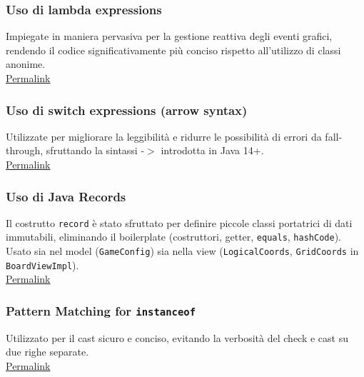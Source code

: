 \documentclass[a4paper,12pt]{report}
\begin{document}
\subsubsection{Uso di lambda expressions}
Impiegate in maniera pervasiva per la gestione reattiva degli eventi grafici, rendendo il codice significativamente più conciso rispetto all'utilizzo di classi anonime.\\
\href{https://github.com/Nick-2002b/PSS25-Gioco-Oca/blob/e81943445d44f9befaaf74b02e1793cb20d0ce74/src/main/java/it/unibo/giocooca/view/impl/SettingsViewImpl.java#L97}{Permalink}

\subsubsection{Uso di switch expressions (arrow syntax)}
Utilizzate per migliorare la leggibilità e ridurre le possibilità di errori da fall-through, sfruttando la sintassi -$>$ introdotta in Java 14+.\\
\href{https://github.com/Nick-2002b/PSS25-Gioco-Oca/blob/e81943445d44f9befaaf74b02e1793cb20d0ce74/src/main/java/it/unibo/giocooca/view/impl/BoardViewImpl.java#L117-L122}{Permalink}

\subsubsection{Uso di Java Records}
Il costrutto \texttt{record} è stato sfruttato per definire piccole classi portatrici di dati immutabili, eliminando il boilerplate (costruttori, getter, \texttt{equals}, \texttt{hashCode}). Usato sia nel model (\texttt{GameConfig}) sia nella view (\texttt{LogicalCoords}, \texttt{GridCoords} in \texttt{BoardViewImpl}).\\
\href{https://github.com/Nick-2002b/PSS25-Gioco-Oca/blob/e81943445d44f9befaaf74b02e1793cb20d0ce74/src/main/java/it/unibo/giocooca/view/impl/BoardViewImpl.java#L430-L434)}{Permalink}

\subsubsection{Pattern Matching for \texttt{instanceof}}
Utilizzato per il cast sicuro e conciso, evitando la verbosità del check e cast su due righe separate.\\
\href{https://github.com/Nick-2002b/PSS25-Gioco-Oca/blob/e81943445d44f9befaaf74b02e1793cb20d0ce74/src/main/java/it/unibo/giocooca/navigation/impl/SceneManagerImpl.java#L84}{Permalink}
\end{document}
